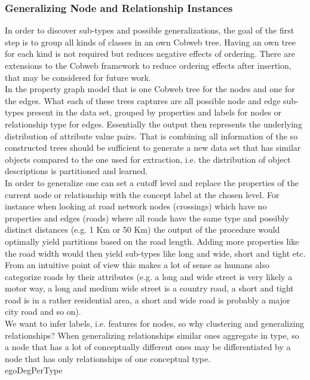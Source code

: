 \subsubsection{Generalizing Node and Relationship Instances}\label{\positionnumber}
In order to discover sub-types and possible generalizations, the goal of the first step is to group all kinds of classes in an own Cobweb tree. Having an own tree for each kind is not required but reduces negative effects of ordering. There are extensions to the Cobweb framework to reduce ordering effects after insertion, that may be considered for future work. \\
In the property graph model that is one Cobweb tree for the nodes and one for the edges. What each of these trees captures are all possible node and edge sub-types present in the data set, grouped by properties and labels for nodes or relationship type for edges. Essentially the output then represents the underlying distribution of attribute value pairs. That is combining all information of the so constructed trees should be sufficient to generate a new data set that has similar objects compared to the one used for extraction, i.e. the distribution of object descriptions is partitioned and  learned. \\
In order to generalize one can set a cutoff level and replace the properties of the current node or relationship with the concept label at the chosen level. For instance when looking at road network nodes (crossings) which have no properties and edges (roads) where all roads have the same type and possibly distinct distances (e.g. 1 Km or 50 Km) the output of the procedure would optimally yield partitions based on the road length. Adding more properties like the road width would then yield sub-types like long and wide, short and tight etc. From an intuitive point of view this makes a lot of sense as humans also categorize roads by their attributes (e.g. a long and wide street is very likely a motor way, a long and medium wide street is a country road, a short and tight road is in a rather residential area, a short and wide road is probably a major city road and so on). \\
We want to infer labels, i.e. features for nodes, so why clustering and generalizing relationships? When generalizing relationships similar ones aggregate in type, so a node that has a lot of conceptually different ones may be differentiated by a node that has only relationships of one conceptual type. \\
egoDegPerType

